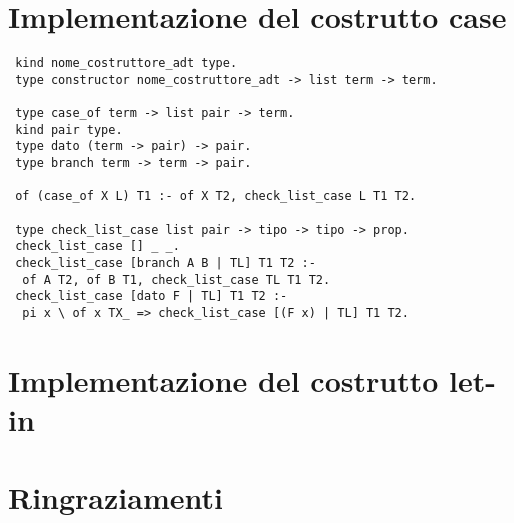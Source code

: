 \documentclass[12pt,a4paper,openright,twoside]{report}
\begin{document}
\clearpage{\pagestyle{empty}\cleardoublepage}		%


\appendix   %



\chapter{Implementazione del costrutto case}   %
\begin{verbatim}
 kind nome_costruttore_adt type.
 type constructor nome_costruttore_adt -> list term -> term.

 type case_of term -> list pair -> term.
 kind pair type.
 type dato (term -> pair) -> pair.
 type branch term -> term -> pair.

 of (case_of X L) T1 :- of X T2, check_list_case L T1 T2.

 type check_list_case list pair -> tipo -> tipo -> prop.
 check_list_case [] _ _.
 check_list_case [branch A B | TL] T1 T2 :-
  of A T2, of B T1, check_list_case TL T1 T2.
 check_list_case [dato F | TL] T1 T2 :-
  pi x \ of x TX_ => check_list_case [(F x) | TL] T1 T2.
\end{verbatim}


\clearpage{\pagestyle{empty}\cleardoublepage}		%


\chapter{Implementazione del costrutto let-in}     %


\clearpage{\pagestyle{empty}\cleardoublepage}		%









\chapter*{Ringraziamenti}

\thispagestyle{empty}

\end{document}
